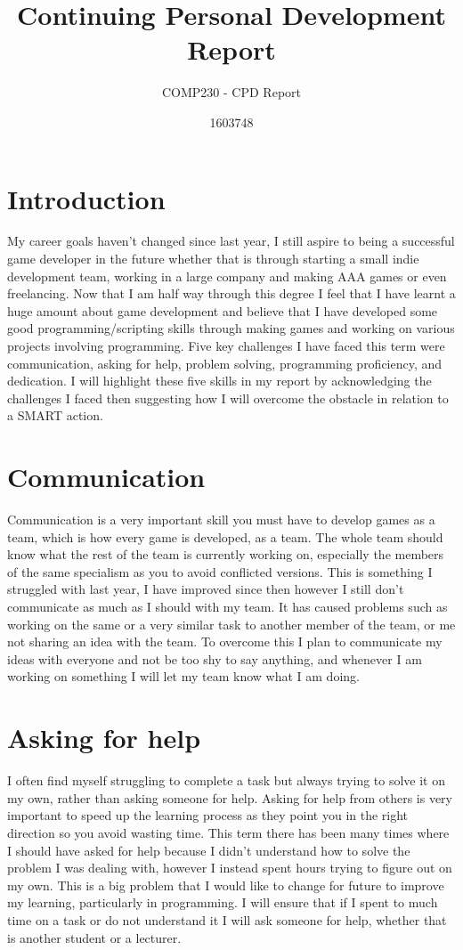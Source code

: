 \documentclass{scrartcl}
\title{Continuing Personal Development Report}
\subtitle{COMP230 - CPD Report}
\author{1603748}
\begin{document}
\maketitle

\section*{Introduction}
My career goals haven't changed since last year, I still aspire to being a successful game developer in the future whether that is through starting a small indie development team, working in a large company and making AAA games or even freelancing. Now that I am half way through this degree I feel that I have learnt a huge amount about game development and believe that I have developed some good programming/scripting skills through making games and working on various projects involving programming. Five key challenges I have faced this term were communication, asking for help, problem solving, programming proficiency, and dedication. I will highlight these five skills in my report by acknowledging the challenges I faced then suggesting how I will overcome the obstacle in relation to a SMART action.

\section{Communication}
Communication is a very important skill you must have to develop games as a team, which is how every game is developed, as a team. The whole team should know what the rest of the team is currently working on, especially the members of the same specialism as you to avoid conflicted versions. This is something I struggled with last year, I have improved since then however I still don't communicate as much as I should with my team. It has caused problems such as working on the same or a very similar task to another member of the team, or me not sharing an idea with the team. To overcome this I plan to communicate my ideas with everyone and not be too shy to say anything, and whenever I am working on something I will let my team know what I am doing.

\section{Asking for help}
I often find myself struggling to complete a task but always trying to solve it on my own, rather than asking someone for help. Asking for help from others is very important to speed up the learning process as they point you in the right direction so you avoid wasting time. This term there has been many times where I should have asked for help because I didn't understand how to solve the problem I was dealing with, however I instead spent hours trying to figure out on my own. This is a big problem that I would like to change for future to improve my learning, particularly in programming. I will ensure that if I spent to much time on a task or do not understand it I will ask someone for help, whether that is another student or a lecturer. 
\end{document}
